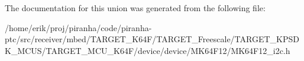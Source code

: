 The documentation for this union was generated from the following file\+:\begin{DoxyCompactItemize}
\item 
/home/erik/proj/piranha/code/piranha-\/ptc/src/receiver/mbed/\+T\+A\+R\+G\+E\+T\+\_\+\+K64\+F/\+T\+A\+R\+G\+E\+T\+\_\+\+Freescale/\+T\+A\+R\+G\+E\+T\+\_\+\+K\+P\+S\+D\+K\+\_\+\+M\+C\+U\+S/\+T\+A\+R\+G\+E\+T\+\_\+\+M\+C\+U\+\_\+\+K64\+F/device/device/\+M\+K64\+F12/M\+K64\+F12\+\_\+i2c.\+h\end{DoxyCompactItemize}
